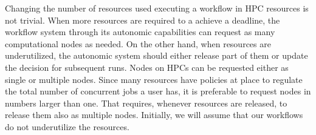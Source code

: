 Changing the number of resources used executing a workflow in HPC resources is 
not trivial. When more resources are required to a achieve a deadline, the 
workflow system through its autonomic capabilities can request as many 
computational nodes as needed.  On the other hand, when resources are 
underutilized, the autonomic system should either release part of them or 
update the decision for subsequent runs. Nodes on HPCs can be requested either 
as single or multiple nodes. Since many resources have policies at place to 
regulate the total number of concurrent jobs a user has, it is preferable to 
request nodes in numbers larger than one. That requires, whenever resources are 
released, to release them also as multiple nodes. Initially, we will assume 
that our workflows do not underutilize the resources.



